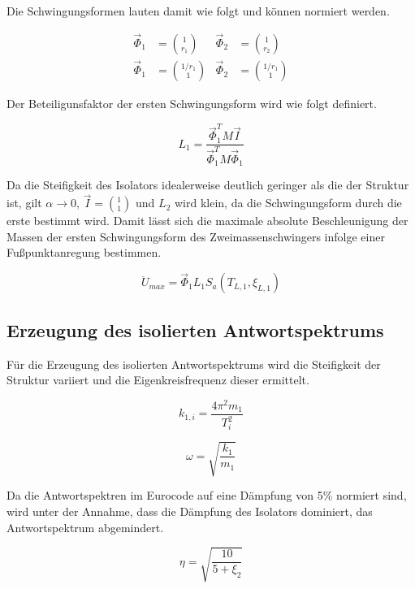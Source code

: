 Die Schwingungsformen lauten damit wie folgt und können normiert werden.

\begin{align}
\vec{\Phi}_1 &= \binom{1}{r_1} & \vec{\Phi}_2 &= \binom{1}{r_2}\\
\vec{\Phi}_1 &= \binom{1/r_1}{1} & \vec{\Phi}_2 &= \binom{1/r_1}{1}
\end{align}

Der Beteiligunsfaktor der ersten Schwingungsform wird wie folgt definiert.

\begin{equation}
L_1 = \frac{\vec{\Phi}_1^T M \vec{I}}{\vec{\Phi}_1^T M \vec{\Phi}_1}
\end{equation}

Da die Steifigkeit des Isolators idealerweise deutlich geringer als die der Struktur ist, gilt $\alpha \rightarrow 0$, $\vec{I} = \binom{1}{1}$ und $L_2$ wird klein, da die Schwingungsform durch die erste bestimmt wird.
Damit lässt sich die maximale absolute Beschleunigung der Massen der ersten Schwingungsform des Zweimassenschwingers infolge einer Fußpunktanregung bestimmen.

\begin{equation}
\ddot U_{max} = \vec{\Phi}_1 L_1 S_a(T_{L,1}, \xi_{L,1})
\end{equation}

\subsection{Erzeugung des isolierten Antwortspektrums}
\label{sec:vereinfAWS}

Für die Erzeugung des isolierten Antwortspektrums wird die Steifigkeit der Struktur variiert und die Eigenkreisfrequenz dieser ermittelt.

\begin{equation}
k_{1,i} = \frac{4 \pi^2 m_1}{T_i^2}
\end{equation}

\begin{equation}
\omega = \sqrt{\frac{k_1}{m_1}}
\end{equation}

Da die Antwortspektren im Eurocode auf eine Dämpfung von 5\% normiert sind, wird unter der Annahme, dass die Dämpfung des Isolators dominiert, das Antwortspektrum abgemindert.

\begin{equation}\label{eta}
\eta = \sqrt{\frac{10}{5 + \xi_2}}
\end{equation}

